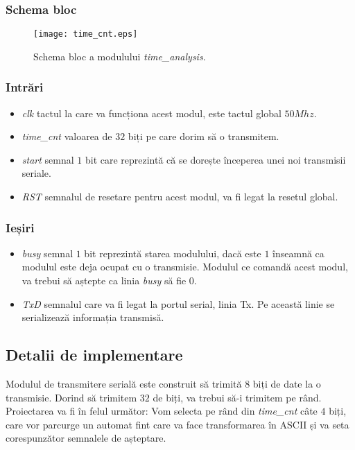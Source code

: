 \documentclass[12pt,twoside,a4paper,fleqn]{book}
\theoremstyle{definition}
\begin{document}
\subsubsection{Schema bloc}
\begin{figure}[h]
\texttt{[image: time\_cnt.eps]}
\caption{\small{Schema bloc a modulului \emph{time\_analysis}.}}
\label{fig:fig_time_analysis}
\end{figure}

\subsubsection{Intrări}
\begin{itemize}
\item \emph{clk} tactul la care va funcționa acest modul, este tactul global $50Mhz$.
\item \emph{time\_cnt} valoarea de $32$ biți pe care dorim să o transmitem.
\item \emph{start} semnal $1$ bit care reprezintă că se dorește începerea unei noi transmisii seriale.
\item \emph{RST} semnalul de resetare pentru acest modul, va fi legat la resetul global.
\end{itemize}

\subsubsection{Ieșiri}
\begin{itemize}
\item \emph{busy} semnal $1$ bit reprezintă starea modulului, dacă este $1$ înseamnă ca modulul este deja ocupat cu o transmisie. Modulul ce comandă acest modul, va trebui să aștepte ca linia \emph{busy} să fie $0$.
\item \emph{TxD} semnalul care va fi legat la portul serial, linia Tx. Pe această linie se serializează informația transmisă.
\end{itemize}

\subsection{Detalii de implementare}
Modulul de transmitere serială este construit să trimită $8$ biți de date la o transmisie. Dorind să trimitem $32$ de biți, va trebui să-i trimitem pe rând. Proiectarea va fi în felul următor: Vom selecta pe rând din \emph{time\_cnt} câte $4$ biți, care vor parcurge un automat fint care va face transformarea în ASCII și va seta corespunzător semnalele de așteptare.
\end{document}
